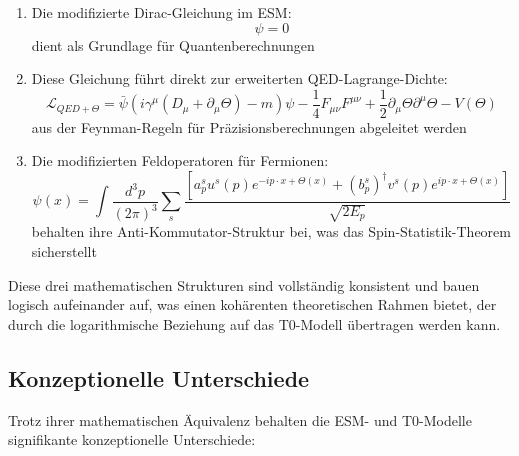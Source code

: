 \documentclass[12pt,a4paper]{article}
\begin{document}
	\begin{enumerate}
		\item Die modifizierte Dirac-Gleichung im ESM:
		\begin{equation}
			[i\gamma^{\mu}(\partial_{\mu} + \partial_{\mu}\Theta) - m]\psi = 0
			\label{eq:esm_dirac_recap}
		\end{equation}
		dient als Grundlage für Quantenberechnungen
		
		\item Diese Gleichung führt direkt zur erweiterten QED-Lagrange-Dichte:
		\begin{equation}
			\mathcal{L}_{QED+\Theta} = \bar{\psi}(i\gamma^{\mu}(D_{\mu} + \partial_{\mu}\Theta) - m)\psi - \frac{1}{4}F_{\mu\nu}F^{\mu\nu} + \frac{1}{2}\partial_{\mu}\Theta\partial^{\mu}\Theta - V(\Theta)
			\label{eq:qed_theta_recap}
		\end{equation}
		aus der Feynman-Regeln für Präzisionsberechnungen abgeleitet werden
		
		\item Die modifizierten Feldoperatoren für Fermionen:
		\begin{equation}
			\psi(x) = \int\frac{d^3p}{(2\pi)^3} \sum_s \frac{[a_p^s u^s(p)e^{-ip\cdot x+\Theta(x)} + (b_p^s)^{\dagger}v^s(p)e^{ip\cdot x+\Theta(x)}]}{\sqrt{2E_p}}
			\label{eq:field_operator_recap}
		\end{equation}
		behalten ihre Anti-Kommutator-Struktur bei, was das Spin-Statistik-Theorem sicherstellt
	\end{enumerate}
	
	Diese drei mathematischen Strukturen sind vollständig konsistent und bauen logisch aufeinander auf, was einen kohärenten theoretischen Rahmen bietet, der durch die logarithmische Beziehung auf das T0-Modell übertragen werden kann.
	
	\subsection{Konzeptionelle Unterschiede}
	\label{subsec:conceptual_differences}
	
	Trotz ihrer mathematischen Äquivalenz behalten die ESM- und T0-Modelle signifikante konzeptionelle Unterschiede:
	
\end{document}

